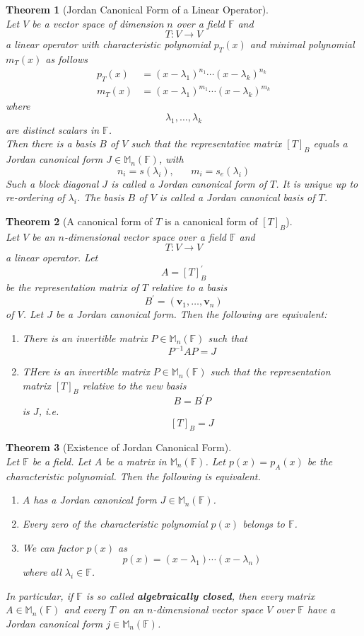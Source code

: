\documentclass[12pt]{article}
\newtheorem{theorem}{Theorem}[section]
\theoremstyle{definition}
\begin{document}
\begin{theorem}[Jordan Canonical Form of a Linear Operator]
\hfill\\\normalfont Let $V$ be a vector space of dimension $n$ over a field $\mathbb{F}$ and
\[
T:V\to V
\]
a linear operator with characteristic polynomial $p_T(x)$ and minimal polynomial $m_T(x)$ as follows
\[
\begin{aligned}
p_T(x)&=(x-\lambda_1)^{n_1}\cdots(x-\lambda_k)^{n_k}\\
m_T(x)&=(x-\lambda_1)^{m_1}\cdots (x-\lambda_k)^{m_k}
\end{aligned}
\]
where
\[
\lambda_1,\ldots,\lambda_k
\]
are distinct scalars in $\mathbb{F}$.\\
Then there is a basis $B$ of $V$ such that the representative matrix $[T]_B$ equals a Jordan canonical form $J\in\mathbb{M}_n(\mathbb{F})$, with
\[
n_i=s(\lambda_i),\;\;\;\;\;\;m_i=s_e(\lambda_i)
\]
Such a block diagonal $J$ is called a Jordan canonical form of $T$. It is unique up to re-ordering of $\lambda_i$. The basis $B$ of $V$ is called a Jordan canonical basis of $T$.
\end{theorem}
\begin{theorem}[A canonical form of $T$ is a canonical form of ${[T]_B}$]
\hfill\\\normalfont Let $V$ be an $n$-dimensional vector space over a field $\mathbb{F}$ and
\[
T:V\to V
\]
a linear operator. Let
\[
A={[T]}_B^\prime
\]
be the representation matrix of $T$ relative to a basis
\[
B^\prime=(\mathbf{v}_1,\ldots,\mathbf{v}_n)
\]
of $V$. Let $J$ be a Jordan canonical form. Then the following are equivalent:
\begin{enumerate}[label=(\arabic*)]
\item There is an invertible matrix $P\in\mathbb{M}_n(\mathbb{F})$ such that
\[
P^{-1}AP=J
\]
\item THere is an invertible matrix $P\in\mathbb{M}_n(\mathbb{F})$ such that the representation matrix $[T]_B$ relative to the new basis
\[
B=B^\prime P
\]
is $J$, i.e.
\[
[T]_B=J
\]
\end{enumerate}
\end{theorem}
\begin{theorem}[Existence of Jordan Canonical Form]
\hfill\\\normalfont Let $\mathbb{F}$ be a field. Let $A$ be a matrix in $\mathbb{M}_n(\mathbb{F})$. Let $p(x) = p_A(x)$ be the characteristic polynomial. Then the following is equivalent.
\begin{enumerate}[label=(\arabic*)]
\item $A$ has a Jordan canonical form $J\in \mathbb{M}_n(\mathbb{F})$.
\item Every zero of the characteristic polynomial $p(x)$ belongs to $\mathbb{F}$.
\item We can factor $p(x)$ as
\[
p(x)=(x-\lambda_1)\cdots(x-\lambda_n)
\]
where all $\lambda_i\in\mathbb{F}$.
\end{enumerate}
In particular, if $\mathbb{F}$ is so called \textbf{algebraically closed}, then every matrix $A\in\mathbb{M}_n(\mathbb{F})$ and every $T$ on an $n$-dimensional vector space $V$ over $\mathbb{F}$ have a Jordan canonical form $j\in\mathbb{M}_n(\mathbb{F})$.
\end{theorem}
\end{document}
